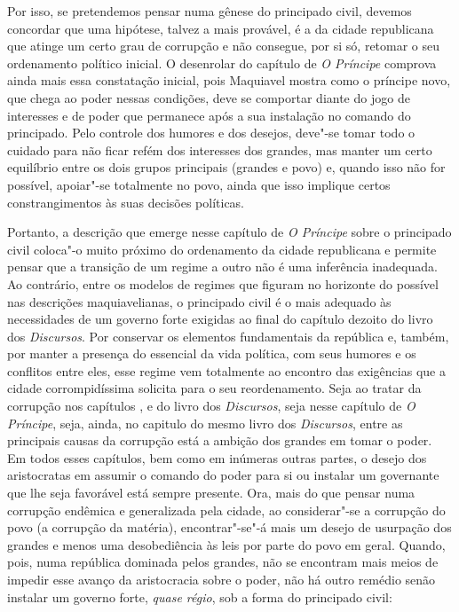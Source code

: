 Por isso, se pretendemos pensar numa gênese do principado civil, devemos
concordar que uma hipótese, talvez a mais provável, é a da cidade
republicana que atinge um certo grau de corrupção e não consegue, por si
só, retomar o seu ordenamento político inicial. O desenrolar do capítulo
 de \emph{O Príncipe} comprova ainda mais essa constatação inicial,
pois Maquiavel mostra como o príncipe novo, que chega ao poder nessas
condições, deve se comportar diante do jogo de interesses e de poder que
permanece após a sua instalação no comando do principado. Pelo controle
dos humores e dos desejos, deve"-se tomar todo o cuidado para não ficar
refém dos interesses dos grandes, mas manter um certo equilíbrio entre
os dois grupos principais (grandes e povo) e, quando isso não for
possível, apoiar"-se totalmente no povo, ainda que isso implique certos
constrangimentos às suas decisões políticas.

Portanto, a descrição que emerge nesse capítulo  de \emph{O
Príncipe} sobre o principado civil coloca"-o muito próximo do
ordenamento da cidade republicana e permite pensar que a transição de um
regime a outro não é uma inferência inadequada. Ao contrário, entre os
modelos de regimes que figuram no horizonte do possível nas descrições
maquiavelianas, o principado civil é o mais adequado às necessidades de
um governo forte exigidas ao final do capítulo dezoito do livro  dos
\emph{Discursos}. Por conservar os elementos fundamentais da república
e, também, por manter a presença do essencial da vida política, com seus
humores e os conflitos entre eles, esse regime vem totalmente ao
encontro das exigências que a cidade corrompidíssima solicita para o seu
reordenamento. Seja ao tratar da corrupção nos capítulos ,  e
 do livro  dos \emph{Discursos}, seja nesse capítulo  de
\emph{O Príncipe}, seja, ainda, no capitulo  do mesmo livro 
dos \emph{Discursos}, entre as principais causas da corrupção está a
ambição dos grandes em tomar o poder. Em todos esses capítulos, bem como
em inúmeras outras partes, o desejo dos aristocratas em assumir o
comando do poder para si ou instalar um governante que lhe seja
favorável está sempre presente. Ora, mais do que pensar numa corrupção
endêmica e generalizada pela cidade, ao considerar"-se a corrupção do
povo (a corrupção da matéria), encontrar"-se"-á mais um desejo de
usurpação dos grandes e menos uma desobediência às leis por parte do
povo em geral. Quando, pois, numa república dominada pelos grandes, não
se encontram mais meios de impedir esse avanço da aristocracia sobre o
poder, não há outro remédio senão instalar um governo forte, \emph{quase
régio}, sob a forma do principado civil:

